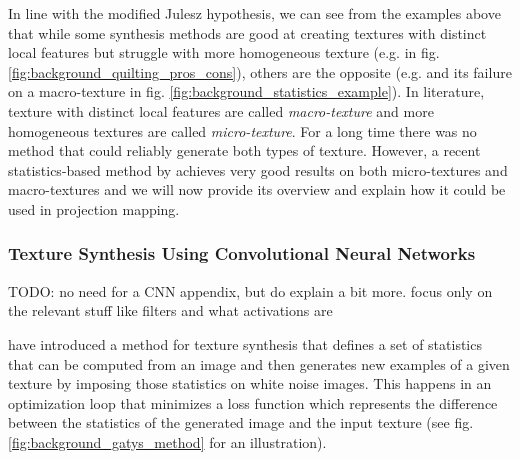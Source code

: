 In line with the modified Julesz hypothesis, we can see from the examples above that while some synthesis methods are good at creating textures with distinct local features but struggle with more homogeneous texture (e.g. \citet{Efros2001} in fig. \ref{fig:background_quilting_pros_cons}), others are the opposite (e.g. \citet{Galerne2011} and its failure on a macro-texture in fig. \ref{fig:background_statistics_example}). In literature, texture with distinct local features are called \textit{macro-texture} and more homogeneous textures are called \textit{micro-texture}. For a long time there was no method that could reliably generate both types of texture. However, a recent statistics-based method by \citet{Gatys2015} achieves very good results on both micro-textures and macro-textures and we will now provide its overview and explain how it could be used in projection mapping.

\subsubsection{Texture Synthesis Using Convolutional Neural Networks}
\label{section:background-texture_synthesis-statistics_based-synthesis_using_cnns}

{\color{red} TODO: no need for a CNN appendix, but do explain a bit more. focus only on the relevant stuff like filters and what activations are}

\citet{Gatys2015} have introduced a method for texture synthesis that defines a set of statistics that can be computed from an image and then generates new examples of a given texture by imposing those statistics on white noise images. This happens in an optimization loop that minimizes a loss function which represents the difference between the statistics of the generated image and the input texture (see fig. \ref{fig:background_gatys_method} for an illustration).

